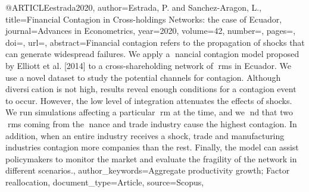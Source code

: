 @ARTICLE{estrada2020,
author={Estrada, P. and Sanchez-Aragon, L.},
title={Financial Contagion in Cross-holdings Networks: the case of Ecuador},
journal={Advances in Econometrics},
year={2020},
volume={42},
number={},
pages={},
doi={},
url={},
abstract={Financial contagion refers to the propagation of shocks that can generate widespread failures. We apply a nancial contagion model proposed by Elliott et al. [2014] to a cross-shareholding network of rms in Ecuador. We use a novel dataset to study the potential channels for contagion. Although diversication is not high, results reveal enough conditions for a contagion event to occur. However, the low level of integration attenuates the effects of shocks. We run simulations affecting a particular rm at the time, and we nd that two rms coming from the nance and trade industry cause the highest contagion. In addition, when an entire industry receives a shock, trade and manufacturing industries contagion more companies than the rest. Finally, the model can assist policymakers to monitor the market and evaluate the fragility of the network in different scenarios.},
author_keywords={Aggregate productivity growth;  Factor reallocation},
document_type={Article},
source={Scopus},
}